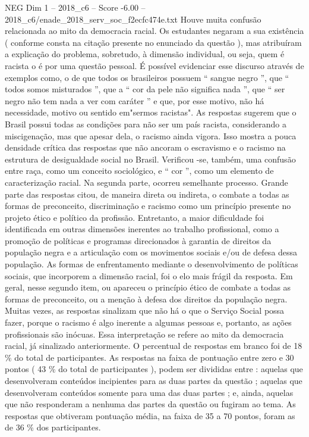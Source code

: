 \begin{textsample}{NEG Dim 1 – 2018\_c6 – Score -6.00 – 2018\_c6/enade\_2018\_serv\_soc\_f2ecfc474e.txt}
Houve muita confusão relacionada ao mito da democracia racial.
Os estudantes negaram a sua existência ( conforme consta na citação presente no enunciado da questão ), mas atribuíram a explicação do problema, sobretudo, à dimensão individual, ou seja, quem é racista o é por uma questão pessoal.
É possível evidenciar esse discurso através de exemplos como, o de que todos os brasileiros possuem “ sangue negro ”, que “ todos somos misturados ”, que a “ cor da pele não significa nada ”, que “ ser negro não tem nada a ver com caráter ” e que, por esse motivo, não há necessidade, motivo ou sentido em"sermos racistas".
As respostas sugerem que o Brasil possui todas as condições para não ser um país racista, considerando a miscigenação, mas que apesar dela, o racismo ainda vigora.
Isso mostra a pouca densidade crítica das respostas que não ancoram o escravismo e o racismo na estrutura de desigualdade social no Brasil.
Verificou -se, também, uma confusão entre raça, como um conceito sociológico, e “ cor ”, como um elemento de caracterização racial.
Na segunda parte, ocorreu semelhante processo.
Grande parte das respostas citou, de maneira direta ou indireta, o combate a todas as formas de preconceito, discriminação e racismo como um princípio presente no projeto ético e político da profissão.
Entretanto, a maior dificuldade foi identificada em outras dimensões inerentes ao trabalho profissional, como a promoção de políticas e programas direcionados à garantia de direitos da população negra e a articulação com os movimentos sociais e/ou de defesa dessa população.
As formas de enfrentamento mediante o desenvolvimento de políticas sociais, que incorporem a dimensão racial, foi o elo mais frágil da resposta.
Em geral, nesse segundo item, ou apareceu o princípio ético de combate a todas as formas de preconceito, ou a menção à defesa dos direitos da população negra.
Muitas vezes, as respostas sinalizam que não há o que o Serviço Social possa fazer, porque o racismo é algo inerente a algumas pessoas e, portanto, as ações profissionais são inócuas.
Essa interpretação se refere ao mito da democracia racial, já sinalizado anteriormente.
O percentual de respostas em branco foi de 18 \% do total de participantes.
As respostas na faixa de pontuação entre zero e 30 pontos ( 43 \% do total de participantes ), podem ser divididas entre : aquelas que desenvolveram conteúdos incipientes para as duas partes da questão ; aquelas que desenvolveram conteúdos somente para uma das duas partes ; e, ainda, aquelas que não responderam a nenhuma das partes da questão ou fugiram ao tema.
As respostas que obtiveram pontuação média, na faixa de 35 a 70 pontos, foram as de 36 \% dos participantes.

\end{textsample}
